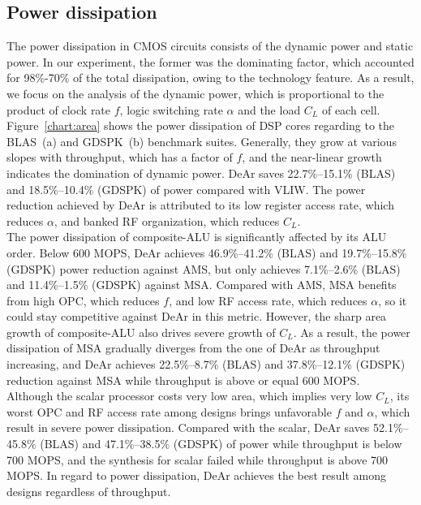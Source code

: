 {    \subsection{Power dissipation}
    The power dissipation in CMOS circuits consists of the dynamic power and static power.
    In our experiment, the former was the dominating factor, which accounted for 98\%-70\% of the total dissipation, 
    owing to the technology feature.
    As a result, we focus on the analysis of the dynamic power, 
    which is proportional to the product of clock rate $f$, logic switching rate $\alpha$ and the load $C_L$ of each cell.
    \\\indent
    Figure~\ref{chart:area} shows the power dissipation of DSP cores regarding to the BLAS~(a) and GDSPK~(b) benchmark suites.
    Generally, they grow at various slopes with throughput, which has a factor of $f$, 
    and the near-linear growth indicates the domination of dynamic power.
    DeAr saves 22.7\%--15.1\% (BLAS) and 18.5\%--10.4\% (GDSPK) of power compared with VLIW.
    The power reduction achieved by DeAr is attributed to its low register access rate, which reduces $\alpha$, 
    and banked RF organization, which reduces $C_L$.
    \\\indent
    The power dissipation of composite-ALU is significantly affected by its ALU order.
    Below 600 MOPS, DeAr achieves 46.9\%--41.2\% (BLAS) and 19.7\%--15.8\% (GDSPK) power reduction against AMS, 
    but only achieves 7.1\%--2.6\% (BLAS) and 11.4\%--1.5\% (GDSPK) against MSA.  
    Compared with AMS, MSA benefits from high OPC, which reduces $f$, and low RF access rate, which reduces $\alpha$, 
    so it could stay competitive against DeAr in this metric.
    However, the sharp area growth of composite-ALU also drives severe growth of $C_L$.
    As a result, the power dissipation of MSA gradually diverges from the one of DeAr as throughput increasing, 
    and DeAr achieves 22.5\%--8.7\% (BLAS) and 37.8\%--12.1\% (GDSPK) reduction against MSA while throughput is above or equal 600 MOPS.
    \\\indent
    Although the scalar processor costs very low area, which implies very low $C_L$, 
    its worst OPC and RF access rate among designs brings unfavorable $f$ and $\alpha$, 
    which result in severe power dissipation. 
    Compared with the scalar, DeAr saves 52.1\%--45.8\% (BLAS) and 47.1\%--38.5\% (GDSPK) of power while throughput is below 700 MOPS, 
    and the synthesis for scalar failed while throughput is above 700 MOPS.
    In regard to power dissipation, DeAr achieves the best result among designs regardless of throughput.
}
